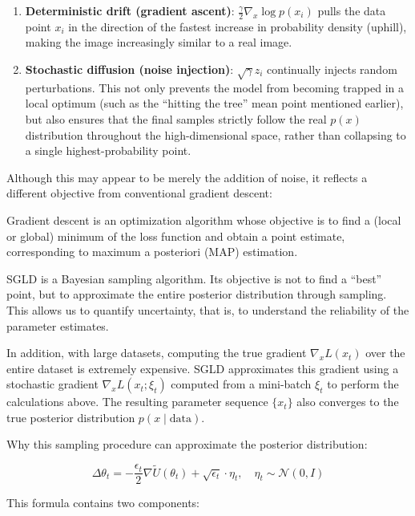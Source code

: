 \begin{enumerate}
\def\labelenumi{\arabic{enumi}.}
\tightlist
\item
  \textbf{Deterministic drift (gradient ascent)}: \(\frac{\gamma}{2}\nabla_x\log p(x_i)\) pulls the data point \(x_i\) in the direction of the fastest increase in probability density (uphill), making the image increasingly similar to a real image.
\item
  \textbf{Stochastic diffusion (noise injection)}: \(\sqrt{\gamma}z_i\) continually injects random perturbations. This not only prevents the model from becoming trapped in a local optimum (such as the ``hitting the tree'' mean point mentioned earlier), but also ensures that the final samples strictly follow the real \(p(x)\) distribution throughout the high-dimensional space, rather than collapsing to a single highest-probability point.
\end{enumerate}

Although this may appear to be merely the addition of noise, it reflects a different objective from conventional gradient descent:

Gradient descent is an optimization algorithm whose objective is to find a (local or global) minimum of the loss function and obtain a point estimate, corresponding to maximum a posteriori (MAP) estimation.

SGLD is a Bayesian sampling algorithm. Its objective is not to find a ``best'' point, but to approximate the entire posterior distribution through sampling. This allows us to quantify uncertainty, that is, to understand the reliability of the parameter estimates.

In addition, with large datasets, computing the true gradient \(\nabla_x L(x_t)\) over the entire dataset is extremely expensive. SGLD approximates this gradient using a stochastic gradient \(\nabla_x L(x_t;\xi_t)\) computed from a mini-batch \(\xi_t\) to perform the calculations above. The resulting parameter sequence \(\{x_t\}\) also converges to the true posterior distribution \(p(x\mid\mathrm{data})\).

Why this sampling procedure can approximate the posterior distribution:

\[
\Delta\theta_t=-\frac{\epsilon_t}{2}\nabla\tilde{U}(\theta_t)+\sqrt{\epsilon_t}\cdot\eta_t,\quad \eta_t\sim\mathcal{N}(0,I)
\]

This formula contains two components:

